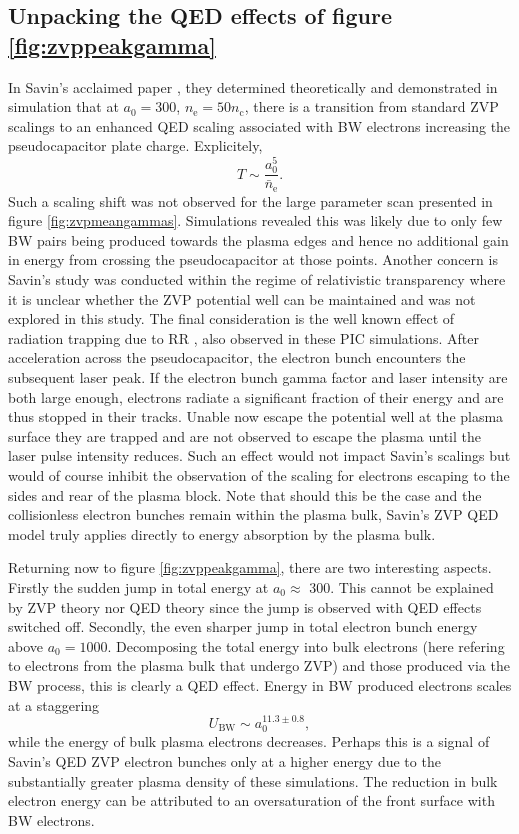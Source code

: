 \subsection{Unpacking the QED effects of figure \ref{fig:zvppeakgamma}}
In Savin's acclaimed paper \cite{savinEnergyAbsorptionLaserQED2019}, they determined theoretically and demonstrated in simulation that at $a_0 = 300$, $n_\mathrm{e} = 50 n_\mathrm{c}$, there is a transition from standard ZVP scalings to an enhanced QED scaling associated with \ac{BW} electrons increasing the pseudocapacitor plate charge. Explicitely,
\begin{equation}
	T \sim \frac{a^5_0}{\bar{n}_\mathrm{e}}.
\end{equation}
Such a scaling shift was not observed for the large parameter scan presented in figure \ref{fig:zvpmeangammas}. Simulations revealed this was likely due to only few \ac{BW} pairs being produced towards the plasma edges and hence no additional gain in energy from crossing the pseudocapacitor at those points. Another concern is Savin's study was conducted within the regime of relativistic transparency where it is unclear whether the ZVP potential well can be maintained and was not explored in this study. The final consideration is the well known effect of radiation trapping due to \ac{RR} \cite{jiRadiationReactionTrappingElectrons2014}, also observed in these PIC simulations. After acceleration across the pseudocapacitor, the electron bunch encounters the subsequent laser peak. If the electron bunch gamma factor and laser intensity are both large enough, electrons radiate a significant fraction of their energy and are thus stopped in their tracks. Unable now escape the potential well at the plasma surface they are trapped and are not observed to escape the plasma until the laser pulse intensity reduces. Such an effect would not impact Savin's scalings but would of course inhibit the observation of the scaling for electrons escaping to the sides and rear of the plasma block. Note that should this be the case and the collisionless electron bunches remain within the plasma bulk, Savin's ZVP QED model truly applies directly to energy absorption by the plasma bulk.

Returning now to figure \ref{fig:zvppeakgamma}, there are two interesting aspects. Firstly the sudden jump in total energy at $a_0 \approx$ 300. This cannot be explained by ZVP theory nor QED theory since the jump is observed with QED effects switched off. Secondly, the even sharper jump in total electron bunch energy above $a_0 = 1000$. Decomposing the total energy into bulk electrons (here refering to electrons from the plasma bulk that undergo ZVP) and those produced via the BW process, this is clearly a QED effect. Energy in BW produced electrons scales at a staggering
\begin{equation}
	U_\mathrm{BW} \sim a^{11.3\pm 0.8}_0,
\end{equation}
while the energy of bulk plasma electrons decreases. Perhaps this is a signal of Savin's QED ZVP electron bunches only at a higher energy due to the substantially greater plasma density of these simulations. The reduction in bulk electron energy can be attributed to an oversaturation of the front surface with BW electrons.

